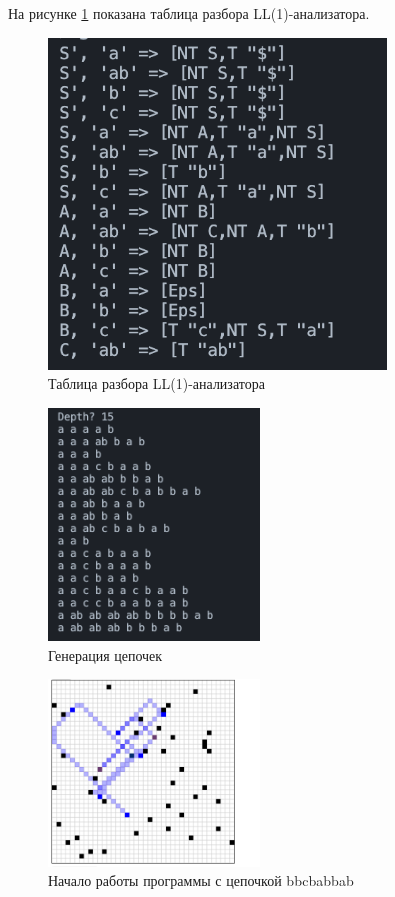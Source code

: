 \documentclass[areasetadvanced]{scrartcl}
\begin{document}
На рисунке \ref{fig:table} показана таблица разбора LL(1)-анализатора.

\begin{figure}[h]
  \centering
  \includegraphics[width=0.8\textwidth]{images/table.png}
  \caption{Таблица разбора LL(1)-анализатора}
  \label{fig:table}
\end{figure}

\begin{figure}[H]
  \centering
  \includegraphics[width=0.5\textwidth]{images/Depth.png}
  \caption{Генерация цепочек}
  \label{fig:gen}
\end{figure}

\begin{figure}[H]
  \centering
  \includegraphics[width=0.5\textwidth]{images/result.png}
  \caption{Начало работы программы с цепочкой bbcbabbab}
  \label{fig:start}
\end{figure}
\end{document}
